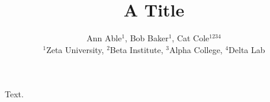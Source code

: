 \documentclass{article}
\begin{document}
\title{A Title}
\author{Ann Able$^{1}$, Bob Baker$^{1}$, Cat Cole$^{1234}$ \\
$^1$Zeta University, $^2$Beta Institute, $^3$Alpha College, $^4$Delta Lab}
\maketitle
Text.
\end{document}

